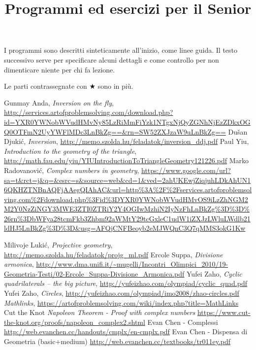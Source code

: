 \documentclass[a4paper,10pt]{article}
\title{Programmi ed esercizi per il Senior}
\date{}
\begin{document}
\maketitle


I programmi sono descritti sinteticamente all'inizio, come linee guida. Il testo successivo serve per specificare alcuni dettagli e come controllo per non dimenticare niente per chi fa lezione. 
\bigskip

Le parti contrassegnate con $\bigstar$ sono in più.

\vspace{1cm}
 
 \clearpage
 
 
 \clearpage
 
 
 \clearpage 

 \begin{thebibliography}{9}
	\bibitem[1]{} Gunmay Anda, \emph{Inversion on the fly}, \url{http://services.artofproblemsolving.com/download.php?id=YXR0YWNobWVudHMvNy85LzRiMmFiYzk1NTgxNjQyZGNhNjEzZDkxOGQ0OTFmN2UyYWFlMDc3LnBkZg==&rn=SW52ZXJzaW9uLnBkZg==}
	\bibitem[2]{} Du\v{s}an Djuki\' c, \emph{Inversion}, \url{http://memo.szolda.hu/feladatok/inversion_ddj.pdf}
	\bibitem[3]{} Paul Yiu, \emph{Introduction to the geometry of the triangle}, \url{http://math.fau.edu/yiu/YIUIntroductionToTriangleGeometry121226.pdf}
	\bibitem[4]{} Marko Radovanovi\'c, \emph{Complex numbers in geometry}, 
	\url{https://www.google.com/url?sa=t&rct=j&q=&esrc=s&source=web&cd=1&ved=2ahUKEwjZiqjuhLDkAhUN16QKHZTNBnAQFjAAegQIAhAC&url=http\%3A\%2F\%2Fservices.artofproblemsolving.com\%2Fdownload.php\%3Fid\%3DYXR0YWNobWVudHMvOS9iLzZhNGM2M2Y0NzZiNGY3MWE3ZTI0ZTRiY2Y4OGIwMzhiN2IyNzFhLnBkZg\%3D\%3D\%26rn\%3DbWFya28tcmFkb3Zhbm92aWMtY29tcGxleC1udW1iZXJzLWluLWdlb21ldHJ5LnBkZg\%3D\%3D&usg=AFQjCNFBeoyb2eMJWQnC3Q7qMMS3okG1Kw}
	
	\bibitem[5]{} Milivoje Luki\'c, \emph{Projective geometry}, \url{http://memo.szolda.hu/feladatok/projg_ml.pdf}
	\bibitem[6]{} Ercole Suppa, \emph{Divisione armonica}, \url{http://www.dma.unifi.it/~mugelli/Incontri_Olimpici_2010/19-Geometria-Testi/02-Ercole_Suppa-Divisione_Armonica.pdf}
	\bibitem[7]{} Yufei Zaho, \emph{Cyclic quadrilaterals -- the big picture}, \url{http://yufeizhao.com/olympiad/cyclic_quad.pdf}
	\bibitem[8]{} Yufei Zaho, \emph{Circles}, \url{http://yufeizhao.com/olympiad/imo2008/zhao-circles.pdf}
	\bibitem[9]{} \emph{Mathlinks}, \url{https://artofproblemsolving.com/wiki/index.php?title=MathLinks}
	Cut the Knot \emph{Napoleon Theorem - Proof with complex numbers} \url{ https://www.cut-the-knot.org/proofs/napoleon_complex2.shtml}
	 Evan Chen - Complessi \url{http://web.evanchen.cc/handouts/cmplx/en-cmplx.pdf}
	 Evan Chen - Dispensa di Geometria (basic+medium) \url{http://web.evanchen.cc/textbooks/tr011ey.pdf}
\end{thebibliography}
 
 
\end{document}
